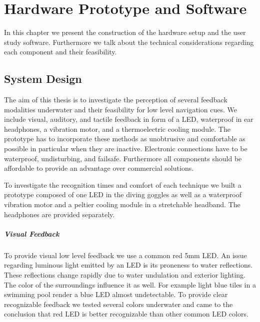 %

\chapter{Hardware Prototype and Software }
\label{ownwork} 


In this chapter we present the construction of the hardware setup and the user study software. 
Furthermore we talk about the technical considerations regarding each component and their feasibility.


\section{System Design}
The aim of this thesis is to investigate the perception of several feedback modalities underwater and their feasibility for low level navigation cues.
We include visual, auditory, and tactile feedback in form of a LED, waterproof in ear headphones,  a vibration motor, and a thermoelectric cooling module.
The prototype has to incorporate these methods as unobtrusive and comfortable as possible in particular when they are  inactive. 
Electronic connections have to be waterproof, undisturbing, and failsafe.
Furthermore all components should be affordable to provide an advantage over commercial solutions.

To investigate the recognition times and comfort of each technique we built a prototype composed of one LED in the diving goggles as well as a waterproof vibration motor and a peltier cooling module in a stretchable headband.
The headphones are provided separately.

\paragraph{Visual Feedback}
To provide visual low level feedback we use a common red 5mm LED.
An issue regarding luminous light emitted by an LED is its proneness to water reflections.
These reflections change rapidly due to water undulation and exterior lighting.
The color of the surroundings influence it as well.
For example light blue tiles in a swimming pool render a blue LED almost undetectable.
To provide clear recognizable feedback we tested several colors underwater and came to the conclusion that red LED is better recognizable than other common LED colors.




